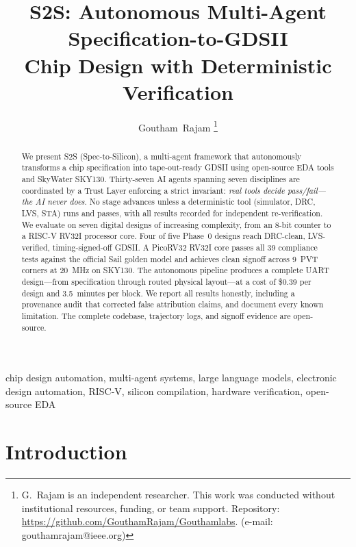 \documentclass[journal]{IEEEtran}
\begin{document}
\title{S2S: Autonomous Multi-Agent Specification-to-GDSII\\Chip Design with Deterministic Verification}

\author{Goutham~Rajam%
\thanks{G.~Rajam is an independent researcher. This work was conducted without institutional resources, funding, or team support. Repository: \url{https://github.com/GouthamRajam/Gouthamlabs}. (e-mail: gouthamrajam@ieee.org)}%
}

\maketitle

\begin{abstract}
We present S2S (Spec-to-Silicon), a multi-agent framework that autonomously transforms a chip specification into tape-out-ready GDSII using open-source EDA tools and SkyWater SKY130. Thirty-seven AI agents spanning seven disciplines are coordinated by a Trust Layer enforcing a strict invariant: \emph{real tools decide pass/fail---the AI never does}. No stage advances unless a deterministic tool (simulator, DRC, LVS, STA) runs and passes, with all results recorded for independent re-verification. We evaluate on seven digital designs of increasing complexity, from an 8-bit counter to a RISC-V RV32I processor core. Four of five Phase~0 designs reach DRC-clean, LVS-verified, timing-signed-off GDSII. A PicoRV32 RV32I core passes all 39 compliance tests against the official Sail golden model and achieves clean signoff across 9~PVT corners at 20~MHz on SKY130. The autonomous pipeline produces a complete UART design---from specification through routed physical layout---at a cost of \$0.39 per design and 3.5~minutes per block. We report all results honestly, including a provenance audit that corrected false attribution claims, and document every known limitation. The complete codebase, trajectory logs, and signoff evidence are open-source.
\end{abstract}

\begin{IEEEkeywords}
chip design automation, multi-agent systems, large language models, electronic design automation, RISC-V, silicon compilation, hardware verification, open-source EDA
\end{IEEEkeywords}

\section{Introduction}
\label{sec:intro}
\end{document}
